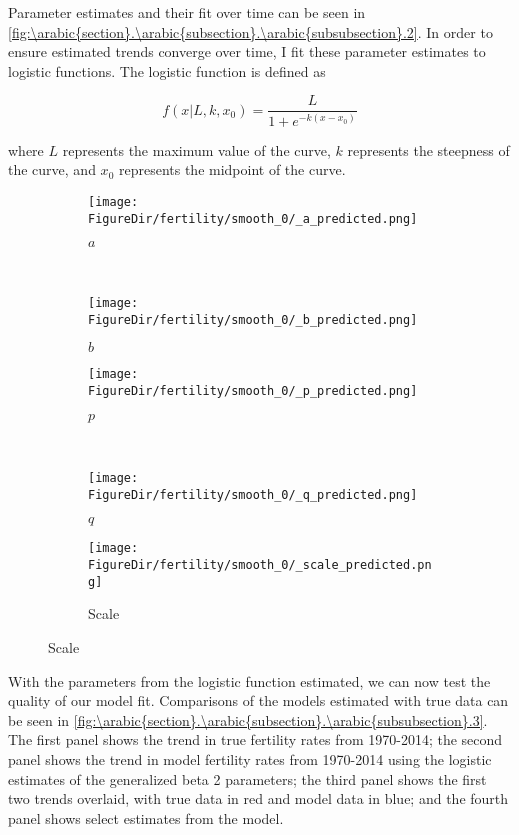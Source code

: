 \documentclass[10pt]{article}
\renewcommand{\thesection}{\arabic{section}}
\renewcommand{\thesubsection}{\thesection.\arabic{subsection}}
\renewcommand{\thesubsubsection}{\thesubsection.\arabic{subsubsection}}
\numberwithin{equation}{subsection}
\newcommand*{\FigureDir}{../../graphs}
\begin{document}
\par Parameter estimates and their fit over time can be seen in \autoref{fig:\thesubsubsection.2}. In order to ensure estimated trends converge over time, I fit these parameter estimates to logistic functions. The logistic function is defined as

\begin{equation}\label{eq:logistic_fn}
   f(x|L, k, x_0) = \frac{L}{1 + e^{-k(x-x_0)}}
\end{equation}

\par where \(L\) represents the maximum value of the curve, \(k\) represents the steepness of the curve, and \(x_0\) represents the midpoint of the curve.

\begin{figure}[!ht]
	\centering
   \caption{\label{fig:\thesubsubsection.2}Fertility Generalized Beta 2 Parameter Estimates}
		\begin{subfigure}{0.5\textwidth}
			\centering
			\texttt{[image: \\FigureDir/fertility/smooth\_0/\_a\_predicted.png]}
			\caption{\(a\)}
		\end{subfigure}%
		~ %
		\begin{subfigure}{0.5\textwidth}
			\centering
			\texttt{[image: \\FigureDir/fertility/smooth\_0/\_b\_predicted.png]}
			\caption{\(b\)}
		\end{subfigure}%
		\newline
		\begin{subfigure}{0.5\textwidth}
			\centering
			\texttt{[image: \\FigureDir/fertility/smooth\_0/\_p\_predicted.png]}
			\caption{\(p\)}
		\end{subfigure}%
		~ %
		\begin{subfigure}{0.5\textwidth}
			\centering
			\texttt{[image: \\FigureDir/fertility/smooth\_0/\_q\_predicted.png]}
			\caption{\(q\)}
      \end{subfigure}%
      \newline
		\begin{subfigure}{0.5\textwidth}
			\centering
			\texttt{[image: \\FigureDir/fertility/smooth\_0/\_scale\_predicted.png]}
			\caption{Scale}
		\end{subfigure}%
\end{figure}

\par With the parameters from the logistic function estimated, we can now test the quality of our model fit. Comparisons of the models estimated with true data can be seen in \autoref{fig:\thesubsubsection.3}. The first panel shows the trend in true fertility rates from 1970-2014; the second panel shows the trend in model fertility rates from 1970-2014 using the logistic estimates of the generalized beta 2 parameters; the third panel shows the first two trends overlaid, with true data in red and model data in blue; and the fourth panel shows select estimates from the model.
\end{document}
